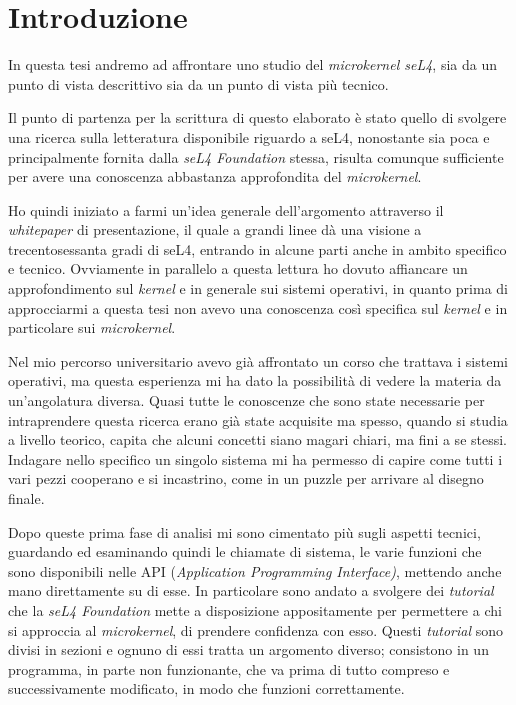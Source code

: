 \chapter{Introduzione}
In questa tesi andremo ad affrontare uno studio del \textit{microkernel seL4}, sia da un punto di vista descrittivo sia da un punto di vista più tecnico.

Il punto di partenza per la scrittura di questo elaborato è stato quello di svolgere una ricerca sulla letteratura disponibile riguardo a seL4, nonostante sia poca e principalmente fornita dalla \textit{seL4 Foundation} stessa, risulta comunque sufficiente per avere una conoscenza abbastanza approfondita del \textit{microkernel}.

Ho quindi iniziato a farmi un'idea generale dell'argomento attraverso il \textit{whitepaper} \cite{sel4-whitepaper} di presentazione, il quale a grandi linee dà una visione a trecentosessanta gradi di seL4, entrando in alcune parti anche in ambito specifico e tecnico. Ovviamente in parallelo a questa lettura ho dovuto affiancare un approfondimento sul \textit{kernel} e in generale sui sistemi operativi, in quanto prima di approcciarmi a questa tesi non avevo una conoscenza così specifica sul \textit{kernel} e in particolare sui \textit{microkernel}.

Nel mio percorso universitario avevo già affrontato un corso che trattava i sistemi operativi, ma questa esperienza mi ha dato la possibilità di vedere la materia da un'angolatura diversa. Quasi tutte le conoscenze che sono state necessarie per intraprendere questa ricerca erano già state acquisite ma spesso, quando si studia a livello teorico, capita che alcuni concetti siano magari chiari, ma fini a se stessi. Indagare nello specifico un singolo sistema mi ha permesso di capire come tutti i vari pezzi cooperano e si incastrino, come in un puzzle per arrivare al disegno finale.

Dopo queste prima fase di analisi mi sono cimentato più sugli aspetti tecnici, guardando ed esaminando quindi le chiamate di sistema, le varie funzioni che sono disponibili nelle API (\textit{Application Programming Interface)}, mettendo anche mano direttamente su di esse. In particolare sono andato a svolgere dei \textit{tutorial} che la \textit{seL4 Foundation} mette a disposizione appositamente per permettere a chi si approccia al \textit{microkernel}, di prendere confidenza con esso. Questi \textit{tutorial} sono divisi in sezioni e ognuno di essi tratta un argomento diverso; consistono in un programma, in parte non funzionante, che va prima di tutto compreso e successivamente modificato, in modo che funzioni correttamente.

